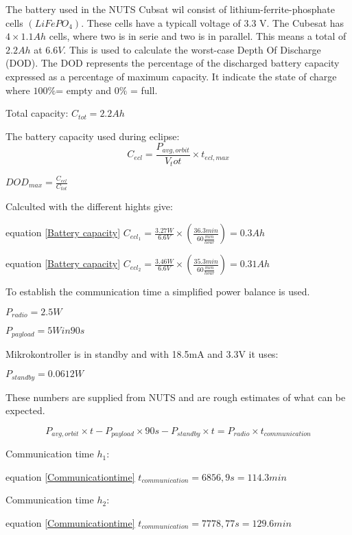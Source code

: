 The battery used in the NUTS Cubsat wil consist of lithium-ferrite-phosphate cells $(LiFePO_4)$. 
These cells have a typicall voltage of 3.3 V. The Cubesat has $4\times 1.1 Ah$ cells, where two is in serie and two is in parallel. This means a total of $2.2Ah$ at $6.6V$. This is used to calculate the worst-case Depth Of Discharge (DOD). The DOD represents the percentage of the discharged battery capacity expressed as a percentage of maximum capacity. It indicate the state of charge where $100\% $= empty and  $0\%$ = full.

\vspace{5 mm}Total capacity: $C_{tot} = 2.2 Ah$

The battery capacity used during eclipse: 
\begin{equation}
C_{ecl} = \frac{P_{avg,orbit}}{V_tot}\times t_{ecl,max}
\label{Battery capacity}
\end{equation}

 $DOD_{max} = \frac{C_{ecl}}{C_{tot}}$

\vspace{5 mm}Calculted with the different hights give:

equation \ref{Battery capacity}
$C_{ecl_1} = \frac{3.27W}{6.6V}\times(\frac{36.3min}{60\frac{min}{hour}}) = 0.3Ah$

equation \ref{Battery capacity}
$C_{ecl_2} = \frac{3.46W}{6.6V}\times(\frac{35.3min}{60\frac{min}{hour}}) = 0.31 Ah$


\vspace{5 mm}To establish the communication time a simplified power balance is used. 

\vspace{5 mm}$P_{radio} = 2.5 W$

$P_{payload} = 5 W in 90s$

Mikrokontroller is in standby and with 18.5mA and 3.3V it uses:

$P_{standby} = 0.0612W$ 

These numbers are supplied from NUTS and are rough estimates of what can be expected.

\begin{equation} P_{avg,orbit}\times t - P_{payload}\times 90s - P_{standby}\times t= P_{radio}\times t_{communication}
\label{Communicationtime}
\end{equation}

Communication time $h_1$:

equation \ref{Communicationtime}
$t_{communication} = 6856,9s =114.3min$

Communication time $h_2$:

equation \ref{Communicationtime}
$t_{communication} = 7778,77s =129.6min$










